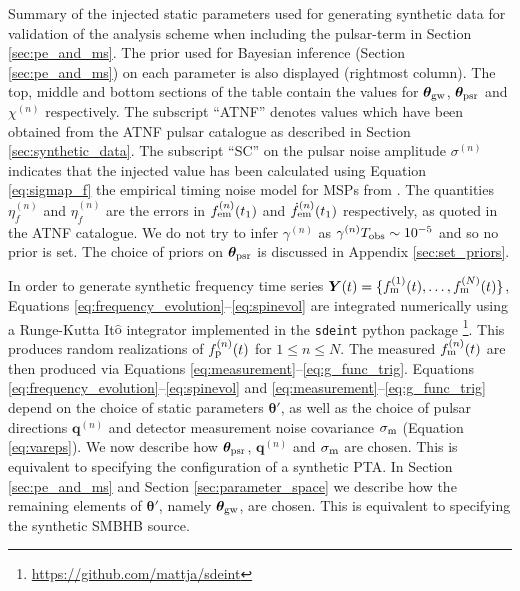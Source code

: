 \documentclass[fleqn,usenatbib,useAMS]{mnras}
\begin{document}
\begin{table}
		\caption{Summary of the injected static parameters used for generating synthetic data for validation of the analysis scheme when including the pulsar-term in Section \ref{sec:pe_and_ms}. The prior used for Bayesian inference (Section \ref{sec:pe_and_ms}) on each parameter is also displayed (rightmost column).  The top, middle and bottom sections of the table contain the values for $\boldsymbol{\theta}_{\rm gw}$, $\boldsymbol{\theta}_{\rm psr}$ and $\chi^{(n)}$ respectively. The subscript ``ATNF'' denotes values which have been obtained from the ATNF pulsar catalogue as described in Section \ref{sec:synthetic_data}. The subscript ``SC'' on the pulsar noise amplitude $\sigma^{(n)}$ indicates that the injected value has been calculated using Equation \eqref{eq:sigmap_f} the empirical timing noise model for MSPs from \protect \cite{Shannon2010}. The quantities $\eta^{(n)}_{f}$ and $\eta^{(n)}_{\dot{f}}$ are the errors in $f^{(n)}_{\rm em} (t_1)$ and $\dot{f}^{(n)}_{\rm em} (t_1)$ respectively, as quoted in the ATNF catalogue. We do not try to infer $\gamma^{(n)}$ as $\gamma^{(n)} T_{\rm obs} \sim 10^{-5}$ and so no prior is set. The choice of priors on $\boldsymbol{\theta}_{\rm psr}$ is discussed in Appendix \ref{sec:set_priors}.
		}
		\label{tab:parameters_and_priors}
	\end{table}
In order to generate synthetic frequency time series $ \boldsymbol{Y}(t) = \{f_{\rm m}^{(1)}(t), \dots, f_{\rm m}^{(N)}(t) \}$, Equations \eqref{eq:frequency_evolution}--\eqref{eq:spinevol} are integrated numerically using a Runge-Kutta It$\hat{\text{o}}$ integrator implemented in the \texttt{sdeint} python package \footnote{\url{https://github.com/mattja/sdeint}}. This produces random realizations of $f_{\rm p}^{(n)}(t)$ for $1\leq n \leq N$. The measured $f_{\rm m}^{(n)}(t)$ are then produced via Equations \eqref{eq:measurement}--\eqref{eq:g_func_trig}. Equations \eqref{eq:frequency_evolution}--\eqref{eq:spinevol} and \eqref{eq:measurement}--\eqref{eq:g_func_trig} depend on the choice of static parameters $\boldsymbol{\theta'}$, as well as the choice of pulsar directions ${\boldsymbol{q}}^{(n)}$ and detector measurement noise covariance $\sigma_{\rm m}$ (Equation \eqref{eq:vareps}). We now describe how $\boldsymbol{\theta}_{\rm psr}$, ${\boldsymbol{q}}^{(n)}$ and $\sigma_{\rm m}$ are chosen. This is equivalent to specifying the configuration of a synthetic PTA. In Section  \ref{sec:pe_and_ms} and Section \ref{sec:parameter_space} we describe how the remaining elements of $\boldsymbol{\theta}'$, namely $\boldsymbol{\theta}_{\rm gw}$, are chosen. This is equivalent to specifying the synthetic SMBHB source.  \newline 
\end{document}
